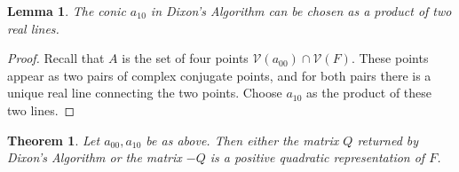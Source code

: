 \documentclass[a4paper,10pt]{amsart}
\theoremstyle{definition}
\theoremstyle{plain}
\newtheorem{thm}[Def]{Theorem}
\newtheorem{lem}[Def]{Lemma}
\newcommand{\cV}{{\mathcal V}}
\begin{document}
\begin{lem}
    The conic $a_{10}$ in Dixon's Algorithm can be chosen as a product of two real lines.
\end{lem}

\begin{proof}
    Recall that $A$ is the set of four points $\cV(a_{00}) \cap \cV(F)$. These points appear as two pairs of complex conjugate points, and for both pairs there is a unique real line connecting the two points. Choose $a_{10}$ as the product of these two lines.
\end{proof}

\begin{thm} \label{thm:posQDR}
    Let $a_{00}, a_{10}$ be as above. Then either the matrix $Q$ returned by Dixon's Algorithm or the matrix $-Q$ is a positive quadratic representation of $F$.
\end{thm}
\end{document}
